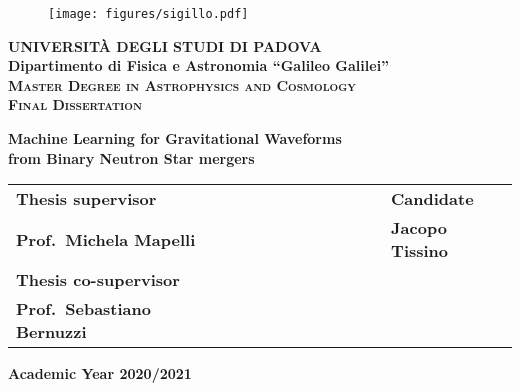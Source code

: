 \documentclass[a4paper,11pt]{book}
\begin{document}
\frontmatter
\begin{titlepage}
\vspace{5mm}
\begin{figure}[hbtp]
\centering
\texttt{[image: figures/sigillo.pdf]}
\end{figure}
\vspace{5mm}
\begin{center}
{{\huge{\textsc{\bf UNIVERSIT\`A DEGLI STUDI DI PADOVA}}}\\}
\vspace{5mm}
{\Large{\bf Dipartimento di Fisica e Astronomia ``Galileo Galilei''}} \\
\vspace{5mm}
{\Large{\textsc{\bf Master Degree in Astrophysics and Cosmology}}}\\
\vspace{15mm}
{\Large{\textsc{\bf Final Dissertation}}}\\
\vspace{20mm}
\begin{spacing}{3}
{\LARGE \textbf{Machine Learning for Gravitational Waveforms \\ from Binary Neutron Star mergers}}\\
\end{spacing}
\vspace{8mm}
\end{center}

\vspace{13mm}
\begin{spacing}{2}
\begin{tabular}{ l  c  c c  c c c c c c c  l }
{\Large{\bf Thesis supervisor}} &&&&&&&&&&& {\Large{\bf Candidate}}\\
{\Large{\bf Prof.\ Michela Mapelli }} &&&&&&&&&&& {\Large{\bf Jacopo Tissino}}\\
{\Large{\bf Thesis co-supervisor}}\\
{\Large{\bf Prof.\ Sebastiano Bernuzzi}}\\
\end{tabular}
\end{spacing}
\vspace{20 mm}

\begin{center}
{\Large{\bf Academic Year 2020/2021}}
\end{center}
\end{titlepage}
\end{document}
